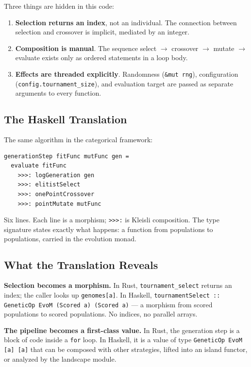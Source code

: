 \documentclass[10pt]{article}
\begin{document}
Three things are hidden in this code:

\begin{enumerate}
  \item \textbf{Selection returns an index}, not an individual. The connection between selection and crossover is implicit, mediated by an integer.
  \item \textbf{Composition is manual}. The sequence select $\to$ crossover $\to$ mutate $\to$ evaluate exists only as ordered statements in a loop body.
  \item \textbf{Effects are threaded explicitly}. Randomness (\texttt{\&mut rng}), configuration (\texttt{config.tournament\_size}), and evaluation target are passed as separate arguments to every function.
\end{enumerate}

\subsection{The Haskell Translation}

The same algorithm in the categorical framework:

\begin{lstlisting}[style=haskellstyle]
generationStep fitFunc mutFunc gen =
  evaluate fitFunc
    >>>: logGeneration gen
    >>>: elitistSelect
    >>>: onePointCrossover
    >>>: pointMutate mutFunc
\end{lstlisting}

Six lines. Each line is a morphism; \texttt{>{>}{>}:} is Kleisli composition. The type signature states exactly what happens: a function from populations to populations, carried in the evolution monad.

\subsection{What the Translation Reveals}

\textbf{Selection becomes a morphism.} In Rust, \texttt{tournament\_select} returns an index; the caller looks up \texttt{genomes[a]}. In Haskell, \texttt{tournamentSelect :: GeneticOp EvoM (Scored a) (Scored a)} --- a morphism from scored populations to scored populations. No indices, no parallel arrays.

\textbf{The pipeline becomes a first-class value.} In Rust, the generation step is a block of code inside a \texttt{for} loop. In Haskell, it is a value of type \texttt{GeneticOp EvoM [a] [a]} that can be composed with other strategies, lifted into an island functor, or analyzed by the landscape module.
\end{document}
